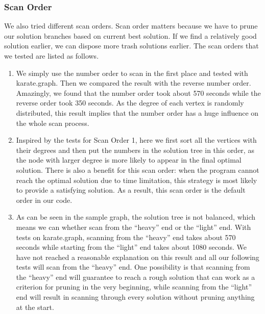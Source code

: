 \subsubsection{Scan Order}
We also tried different scan orders. Scan order matters because we have to prune our solution branches based on current best solution. If we find a relatively good solution earlier, we can dispose more trash solutions earlier. The scan orders that we tested are listed as follows.
\begin{enumerate}
\item We simply use the number order to scan in the first place and tested with karate.graph. Then we compared the result with the reverse number order. Amazingly, we found that the number order took about 570 seconds while the reverse order took 350 seconds. As the degree of each vertex is randomly distributed, this result implies that the number order has a huge influence on the whole scan process.
\item Inspired by the tests for Scan Order 1, here we first sort all the vertices with their degrees and then put the numbers in the solution tree in this order, as the node with larger degree is more likely to appear in the final optimal solution. There is also a benefit for this scan order: when the program cannot reach the optimal solution due to time limitation, this strategy is most likely to provide a satisfying solution. As a result, this scan order is the default order in our code.
\item As can be seen in the sample graph, the solution tree is not balanced, which means we can whether scan from the ``heavy'' end or the ``light'' end. With tests on karate.graph, scanning from the ``heavy'' end takes about 570 seconds while starting from the ``light'' end takes about 1080 seconds. We have not reached a reasonable explanation on this result and all our following tests will scan from the ``heavy'' end. One possibility is that scanning from the ``heavy'' end will guarantee to reach a rough solution that can work as a criterion for pruning in the very beginning, while scanning from the ``light'' end will result in scanning through every solution without pruning anything at the start.
\end{enumerate}
